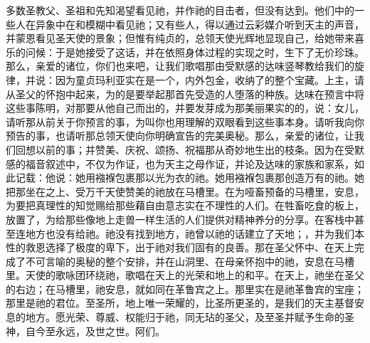 多数圣教父、圣祖和先知渴望看见祂，并作祂的目击者，但没有达到。他们中的一些人在异象中在和模糊中看见祂；又有些人，得以通过云彩媒介听到天主的声音，并蒙恩看见圣天使的景象；但惟有纯贞的，总领天使光辉地显现自己，给她带来喜乐的问候：于是她接受了这话，并在依照身体过程的实现之时，生下了无价珍珠。那么，亲爱的诸位，你们也来吧，让我们歌唱那由受默感的达味竖琴教给我们的旋律，并说：因为童贞玛利亚实在是一个，内外包金，收纳了的整个宝藏。上主，请从圣父的怀抱中起来，为的是要举起那首先受造的人堕落的种族。达味在预言中将这些事陈明，对那要从他自己而出的，并要发芽成为那美丽果实的的，说：女儿，请听那从前关于你预言的事，为叫你也用理解的双眼看到这些事本身。请听我向你预告的事，也请听那总领天使向你明确宣告的完美奥秘。那么，亲爱的诸位，让我们回想以前的事；并赞美、庆祝、颂扬、祝福那从奇妙地生出的枝条。因为在受默感的福音叙述中，不仅为作证，也为天主之母作证，并论及达味的家族和家系，如此记载：他说：她用襁褓包裹那以光为衣的祂。她用襁褓包裹那创造万有的祂。她把那坐在之上、受万千天使赞美的祂放在马槽里。在为哑畜预备的马槽里，安息，为要把真理性的知觉赐给那些藉自由意志实在不理性的人们。在牲畜吃食的板上，放置了，为给那些像地上走兽一样生活的人们提供对精神养分的分享。在客栈中甚至连地方也没有给祂。祂没有找到地方，祂曾以祂的话建立了天地；，并为我们本性的救恩选择了极度的卑下，出于祂对我们固有的良善。那在圣父怀中、在天上完成了不可言喻的奥秘的整个安排，并在山洞里、在母亲怀抱中的祂，安息在马槽里。天使的歌咏团环绕祂，歌唱在天上的光荣和地上的和平。在天上，祂坐在圣父的右边；在马槽里，祂安息，就如同在革鲁宾之上。那里实在是祂革鲁宾的宝座；那里是祂的君位。至圣所，地上唯一荣耀的，比圣所更圣的，是我们的天主基督安息的地方。愿光荣、尊威、权能归于祂，同无玷的圣父，及至圣并赋予生命的圣神，自今至永远，及世之世。阿们。\par

